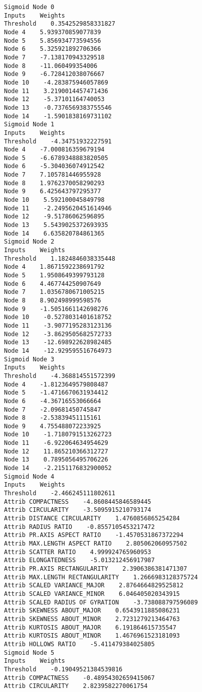 \documentclass[
	article,			%
	11pt,				%
	oneside,			%
	a4paper,			%
	english,			%
	brazil,				%
	sumario=tradicional
	]{abntex2}
\begin{document}
\begin{lstlisting}
Sigmoid Node 0
Inputs    Weights
Threshold    0.3542529858331827
Node 4    5.939370859077839
Node 5    5.856934773594556
Node 6    5.325921892706366
Node 7    -7.138170943329518
Node 8    -11.060499354006
Node 9    -6.728412038076667
Node 10    -4.283875946057869
Node 11    3.2190014457471436
Node 12    -5.37101164740053
Node 13    -0.7376569383755546
Node 14    -1.5901838169731102
Sigmoid Node 1
Inputs    Weights
Threshold    -4.34751932227591
Node 4    -7.000816359679194
Node 5    -6.6789348883820505
Node 6    -5.304036074912542
Node 7    7.105781446955928
Node 8    1.9762370058290293
Node 9    6.425643797295377
Node 10    5.592100045849798
Node 11    -2.2495620451614946
Node 12    -9.51786062596895
Node 13    5.5439025372693935
Node 14    6.635820784861365
Sigmoid Node 2
Inputs    Weights
Threshold    1.1824846038335448
Node 4    1.8671592238691792
Node 5    1.9508649399793128
Node 6    4.467744250907649
Node 7    1.0356780671005215
Node 8    8.902498999598576
Node 9    -1.5051661142698276
Node 10    -0.5278031401618752
Node 11    -3.9077195283123136
Node 12    -3.8629505682572733
Node 13    -12.698922628982485
Node 14    -12.929595516764973
Sigmoid Node 3
Inputs    Weights
Threshold    -4.368814551572399
Node 4    -1.8123649579808487
Node 5    -1.4716670631934412
Node 6    -4.36716553066664
Node 7    -2.09681450745847
Node 8    -2.53839451115161
Node 9    4.755488072233925
Node 10    -1.7180791513262723
Node 11    -6.922064634954629
Node 12    11.865210366312727
Node 13    0.7895056495706226
Node 14    -2.2151176832900052
Sigmoid Node 4
Inputs    Weights
Threshold    -2.466245111802611
Attrib COMPACTNESS    -4.8608445846589445
Attrib CIRCULARITY    -3.5095915210793174
Attrib DISTANCE CIRCULARITY    1.4760856865254284
Attrib RADIUS RATIO    -0.8557105453217472
Attrib PR.AXIS ASPECT RATIO    -1.4570531867372294
Attrib MAX.LENGTH ASPECT RATIO    2.805062060957502
Attrib SCATTER RATIO    4.999924765960953
Attrib ELONGATEDNESS    -5.013212456917987
Attrib PR.AXIS RECTANGULARITY    2.3906386381471307
Attrib MAX.LENGTH RECTANGULARITY    1.2666983128375724
Attrib SCALED VARIANCE_MAJOR    2.8764664829525812
Attrib SCALED VARIANCE_MINOR    6.046405020343915
Attrib SCALED RADIUS OF GYRATION    -3.738088797596089
Attrib SKEWNESS ABOUT_MAJOR    0.6543911885086231
Attrib SKEWNESS ABOUT_MINOR    2.7231279213464763
Attrib KURTOSIS ABOUT_MAJOR    6.191864615735547
Attrib KURTOSIS ABOUT_MINOR    1.4676961523181093
Attrib HOLLOWS RATIO    -5.411479384025805
Sigmoid Node 5
Inputs    Weights
Threshold    -0.19049521384539816
Attrib COMPACTNESS    -0.48954302659415067
Attrib CIRCULARITY    2.8239582270061754

\end{lstlisting}
\end{document}
